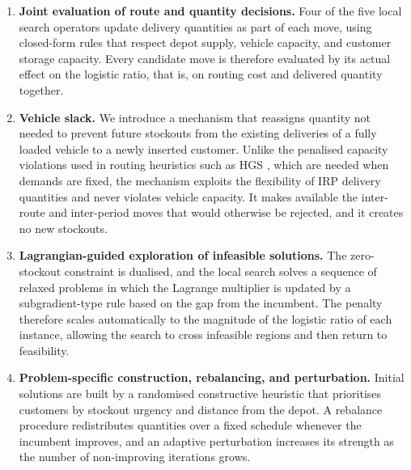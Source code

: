 \documentclass{article}
\begin{document}
\begin{enumerate}
  \item \textbf{Joint evaluation of route and quantity decisions.} Four of
  the five local search operators update delivery quantities as part of
  each move, using closed-form rules that respect depot supply, vehicle
  capacity, and customer storage capacity. Every candidate move is
  therefore evaluated by its actual effect on the logistic ratio, that is,
  on routing cost and delivered quantity together.

  \item \textbf{Vehicle slack.} We introduce a mechanism that reassigns
  quantity not needed to prevent future stockouts from the existing
  deliveries of a fully loaded vehicle to a newly inserted customer.
  Unlike the penalised capacity violations used in routing heuristics such
  as HGS \citep{vidal2022hybrid}, which are needed when demands are fixed,
  the mechanism exploits the flexibility of IRP delivery quantities and
  never violates vehicle capacity. It makes
  available the inter-route and inter-period moves that would otherwise be
  rejected, and it creates no new stockouts.

  \item \textbf{Lagrangian-guided exploration of infeasible solutions.}
  The zero-stockout constraint is dualised, and the local search solves a
  sequence of relaxed problems in which the Lagrange multiplier is updated
  by a subgradient-type rule based on the gap from the incumbent. The
  penalty therefore scales automatically to the magnitude of the logistic
  ratio of each instance, allowing the search to cross infeasible regions
  and then return to feasibility.

  \item \textbf{Problem-specific construction, rebalancing, and
  perturbation.} Initial solutions are built by a randomised constructive
  heuristic that prioritises customers by stockout urgency and distance
  from the depot. A rebalance procedure redistributes quantities over a
  fixed schedule whenever the incumbent improves, and an adaptive
  perturbation increases its strength as the number of non-improving
  iterations grows.


\end{enumerate}
\end{document}
